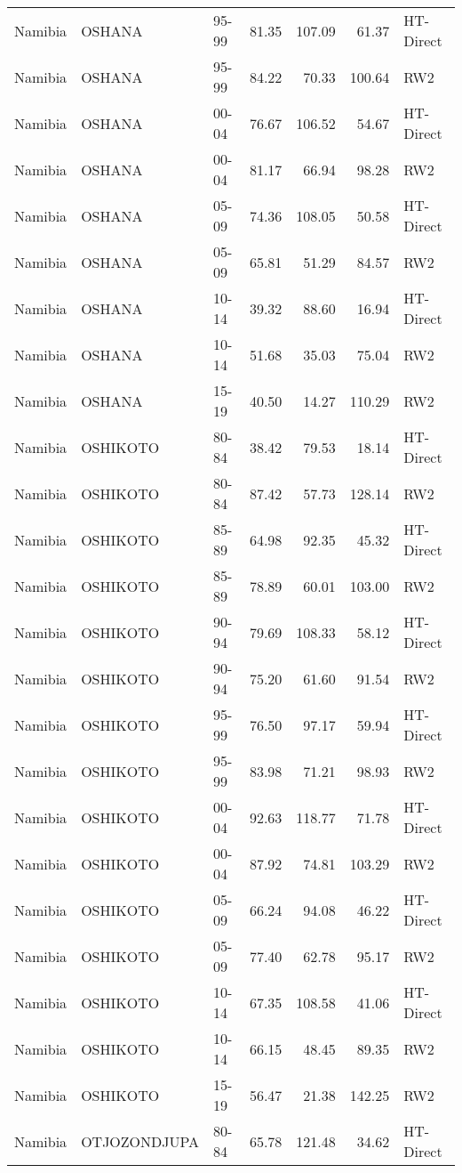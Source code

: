 \begin{longtable}{lllrrrl}
  Namibia & OSHANA & 95-99 & 81.35 & 107.09 & 61.37 & HT-Direct \\ 
  Namibia & OSHANA & 95-99 & 84.22 & 70.33 & 100.64 & RW2 \\ 
  Namibia & OSHANA & 00-04 & 76.67 & 106.52 & 54.67 & HT-Direct \\ 
  Namibia & OSHANA & 00-04 & 81.17 & 66.94 & 98.28 & RW2 \\ 
  Namibia & OSHANA & 05-09 & 74.36 & 108.05 & 50.58 & HT-Direct \\ 
  Namibia & OSHANA & 05-09 & 65.81 & 51.29 & 84.57 & RW2 \\ 
  Namibia & OSHANA & 10-14 & 39.32 & 88.60 & 16.94 & HT-Direct \\ 
  Namibia & OSHANA & 10-14 & 51.68 & 35.03 & 75.04 & RW2 \\ 
  Namibia & OSHANA & 15-19 & 40.50 & 14.27 & 110.29 & RW2 \\ 
  Namibia & OSHIKOTO & 80-84 & 38.42 & 79.53 & 18.14 & HT-Direct \\ 
  Namibia & OSHIKOTO & 80-84 & 87.42 & 57.73 & 128.14 & RW2 \\ 
  Namibia & OSHIKOTO & 85-89 & 64.98 & 92.35 & 45.32 & HT-Direct \\ 
  Namibia & OSHIKOTO & 85-89 & 78.89 & 60.01 & 103.00 & RW2 \\ 
  Namibia & OSHIKOTO & 90-94 & 79.69 & 108.33 & 58.12 & HT-Direct \\ 
  Namibia & OSHIKOTO & 90-94 & 75.20 & 61.60 & 91.54 & RW2 \\ 
  Namibia & OSHIKOTO & 95-99 & 76.50 & 97.17 & 59.94 & HT-Direct \\ 
  Namibia & OSHIKOTO & 95-99 & 83.98 & 71.21 & 98.93 & RW2 \\ 
  Namibia & OSHIKOTO & 00-04 & 92.63 & 118.77 & 71.78 & HT-Direct \\ 
  Namibia & OSHIKOTO & 00-04 & 87.92 & 74.81 & 103.29 & RW2 \\ 
  Namibia & OSHIKOTO & 05-09 & 66.24 & 94.08 & 46.22 & HT-Direct \\ 
  Namibia & OSHIKOTO & 05-09 & 77.40 & 62.78 & 95.17 & RW2 \\ 
  Namibia & OSHIKOTO & 10-14 & 67.35 & 108.58 & 41.06 & HT-Direct \\ 
  Namibia & OSHIKOTO & 10-14 & 66.15 & 48.45 & 89.35 & RW2 \\ 
  Namibia & OSHIKOTO & 15-19 & 56.47 & 21.38 & 142.25 & RW2 \\ 
  Namibia & OTJOZONDJUPA & 80-84 & 65.78 & 121.48 & 34.62 & HT-Direct \\ 

\end{longtable}
